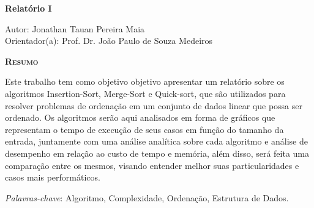\begin{center}
	{\Large{\textbf{Relatório I}}}
\end{center}

\vspace{1cm}

\begin{flushright}
	Autor: Jonathan Tauan Pereira Maia\\
	Orientador(a): Prof. Dr. João Paulo de Souza Medeiros
\end{flushright}

\vspace{1cm}

\begin{center}
	\Large{\textsc{\textbf{Resumo}}}
\end{center}

\noindent  Este trabalho tem como objetivo objetivo apresentar um relatório sobre os algoritmos Insertion-Sort, Merge-Sort e Quick-sort, que são utilizados para resolver problemas de ordenação em um conjunto de dados linear que possa ser ordenado. Os algoritmos serão aqui analisados em forma de gráficos que representam o tempo de execução de seus casos em função do tamanho da entrada, juntamente com uma análise analítica sobre cada algoritmo e análise de desempenho em relação ao custo de tempo e memória, além disso, será feita uma comparação entre os mesmos, visando entender melhor suas particularidades e casos mais performáticos.

\noindent\textit{Palavras-chave}: Algoritmo, Complexidade, Ordenação, Estrutura de Dados.